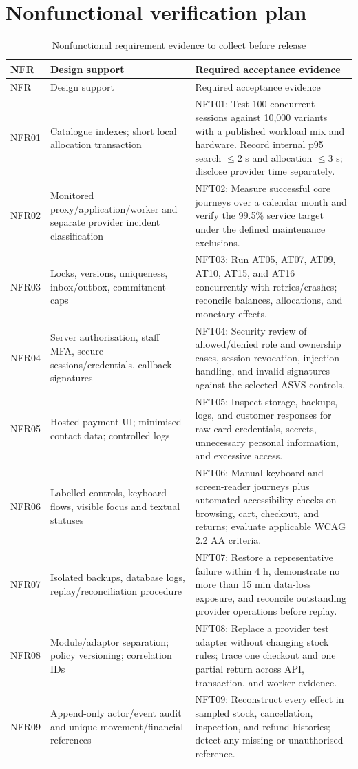 \section{Nonfunctional verification plan}
\begin{longtable}{P{.1\linewidth}P{.31\linewidth}P{.47\linewidth}}
\caption{Nonfunctional requirement evidence to collect before release}\label{tab:trace-nfr}\\
\toprule NFR & Design support & Required acceptance evidence \\\midrule\endfirsthead
\toprule NFR & Design support & Required acceptance evidence \\\midrule\endhead
NFR01 & Catalogue indexes; short local allocation transaction & NFT01: Test 100 concurrent sessions against 10,000 variants with a published workload mix and hardware. Record internal p95 search $\leq2$ s and allocation $\leq3$ s; disclose provider time separately.\\
NFR02 & Monitored proxy/application/worker and separate provider incident classification & NFT02: Measure successful core journeys over a calendar month and verify the 99.5\% service target under the defined maintenance exclusions.\\
NFR03 & Locks, versions, uniqueness, inbox/outbox, commitment caps & NFT03: Run AT05, AT07, AT09, AT10, AT15, and AT16 concurrently with retries/crashes; reconcile balances, allocations, and monetary effects.\\
NFR04 & Server authorisation, staff MFA, secure sessions/credentials, callback signatures & NFT04: Security review of allowed/denied role and ownership cases, session revocation, injection handling, and invalid signatures against the selected ASVS controls.\\
NFR05 & Hosted payment UI; minimised contact data; controlled logs & NFT05: Inspect storage, backups, logs, and customer responses for raw card credentials, secrets, unnecessary personal information, and excessive access.\\
NFR06 & Labelled controls, keyboard flows, visible focus and textual statuses & NFT06: Manual keyboard and screen-reader journeys plus automated accessibility checks on browsing, cart, checkout, and returns; evaluate applicable WCAG 2.2 AA criteria.\\
NFR07 & Isolated backups, database logs, replay/reconciliation procedure & NFT07: Restore a representative failure within 4 h, demonstrate no more than 15 min data-loss exposure, and reconcile outstanding provider operations before replay.\\
NFR08 & Module/adaptor separation; policy versioning; correlation IDs & NFT08: Replace a provider test adapter without changing stock rules; trace one checkout and one partial return across API, transaction, and worker evidence.\\
NFR09 & Append-only actor/event audit and unique movement/financial references & NFT09: Reconstruct every effect in sampled stock, cancellation, inspection, and refund histories; detect any missing or unauthorised reference.\\
\bottomrule
\end{longtable}

